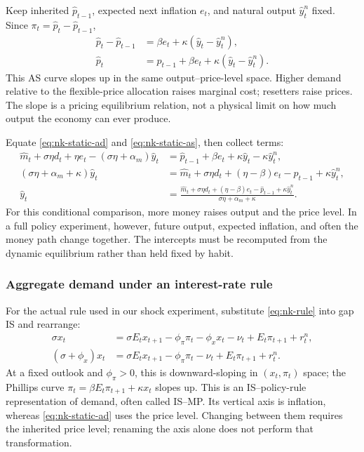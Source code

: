 Keep inherited $\hat p_{t-1}$, expected next inflation $e_t$, and natural
output $\hat y_t^n$ fixed. Since $\pi_t=\hat p_t-\hat p_{t-1}$,
\begin{align}
 \hat p_t-\hat p_{t-1}&=\beta e_t+\kappa(\hat y_t-\hat y_t^n),\\
 \hat p_t&=\hat p_{t-1}+\beta e_t
                                 +\kappa(\hat y_t-\hat y_t^n).
 \label{eq:nk-static-as}
\end{align}
This AS curve slopes up in the same output--price-level space. Higher demand
relative to the flexible-price allocation raises marginal cost; resetters
raise prices. The slope is a pricing equilibrium relation, not a physical
limit on how much output the economy can ever produce.

Equate \eqref{eq:nk-static-ad} and \eqref{eq:nk-static-as}, then collect terms:
\begin{align}
 \hat m_t+\sigma\eta d_t+\eta e_t-(\sigma\eta+\alpha_m)\hat y_t
 &=\hat p_{t-1}+\beta e_t+\kappa\hat y_t-\kappa\hat y_t^n,\\
 (\sigma\eta+\alpha_m+\kappa)\hat y_t
 &=\hat m_t+\sigma\eta d_t+(\eta-\beta)e_t
                            -\hat p_{t-1}+\kappa\hat y_t^n,\\
 \hat y_t&=\frac{\hat m_t+\sigma\eta d_t+(\eta-\beta)e_t
                         -\hat p_{t-1}+\kappa\hat y_t^n}
                        {\sigma\eta+\alpha_m+\kappa}.
\end{align}
For this conditional comparison, more money raises output and the price
level. In a full policy experiment, however, future output, expected inflation,
and often the money path change together. The intercepts must be recomputed
from the dynamic equilibrium rather than held fixed by habit.

\subsubsection{Aggregate demand under an interest-rate rule}

For the actual rule used in our shock experiment, substitute
\eqref{eq:nk-rule} into gap IS and rearrange:
\begin{align}
 \sigma x_t&=\sigma E_tx_{t+1}
       -\phi_\pi\pi_t-\phi_xx_t-\nu_t+E_t\pi_{t+1}+r_t^n,\\
 (\sigma+\phi_x)x_t
 &=\sigma E_tx_{t+1}-\phi_\pi\pi_t-\nu_t+E_t\pi_{t+1}+r_t^n.
\end{align}
At a fixed outlook and $\phi_\pi>0$, this is downward-sloping in
$(x_t,\pi_t)$ space; the Phillips curve
$\pi_t=\beta E_t\pi_{t+1}+\kappa x_t$ slopes up. This is an
IS--policy-rule representation of demand, often called IS--MP.
Its vertical axis is inflation, whereas \eqref{eq:nk-static-ad} uses the
price level. Changing between them requires the inherited price level;
renaming the axis alone does not perform that transformation.

